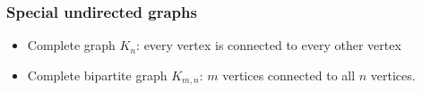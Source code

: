 \begin{frame}
\frametitle{Special undirected graphs}
\begin{itemize}

\pause
\item Complete graph $K_n$: every vertex is connected to every other vertex

\begin{tikzpicture}[scale=0.5, every node/.style={scale=0.5,fill=blue}]

\end{tikzpicture}

\pause
\item Complete bipartite graph $K_{m,n}$: $m$ vertices connected to all $n$ vertices.

\begin{tikzpicture}[scale=0.5, every node/.style={scale=0.5,fill=blue}]

\end{tikzpicture}
\end{itemize}
\end{frame}

